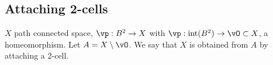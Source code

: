 
\subsection{Attaching 2-cells}

$X$ path connected space, $\vp: B^2 \to X$ with $\vp: \text{int}(B^2) \to \vO \subset X$, a homeomorphism. Let $A = X \setminus \vO$. We say that $X$ is obtained from $A$ by attaching a 2-cell. 
